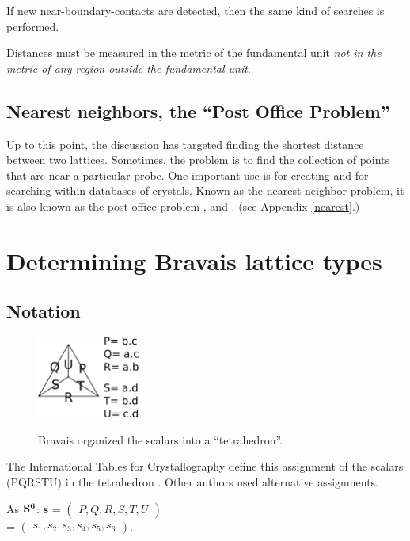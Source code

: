 \documentclass[preprint]{iucr}              %
\numberwithin{equation}{section}
\newcommand{\SVI}[0]{$\bf{S^{6}}$}
\begin{document}
	If new near-boundary-contacts are detected, then the same kind of searches
	is performed.
	
	Distances must be measured in the metric of the fundamental unit 
	\textit{not in the metric of any region outside the fundamental unit}.
	
	
	
	
	\subsection{Nearest neighbors, the ``Post Office Problem''}
	
	Up to this point, the discussion has targeted finding the shortest 
	distance between two lattices. Sometimes, the problem is to find the collection of points
	that are near a particular probe. One important use is for
	creating and for searching within
	databases of crystals. Known as the nearest neighbor problem, it is also
	known as the post-office problem \cite{Andrews2001}, and \cite{Andrews2016}. (see Appendix \ref{nearest}.)
	

\section{Determining Bravais lattice types}

\subsection{Notation}

\begin{figure}
		\includegraphics[width=0.3\textwidth]{PQRSTU} 
	\label{PQRSTU}
	\caption{Bravais organized the scalars into a ``tetrahedron''\cite{Delaunay1932}.}
\end{figure}
   The International
		Tables for Crystallography define this assignment of the scalars (PQRSTU) in
		the tetrahedron \cite{donnay1953international}. Other authors used alternative assignments.

		As \SVI{}: \textbf{s} = $\begin{pmatrix}{P,Q,R, S,T,U}\end{pmatrix}$\\ = $\begin{pmatrix}{s_1, s_2, s_3, s_4, s_5, s_6}\end{pmatrix}$.\\
\end{document}
